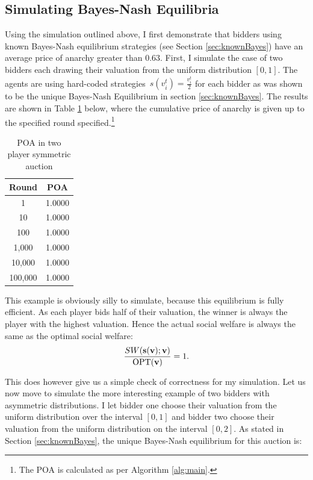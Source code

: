 \documentclass[12pt,twoside]{reedthesis}
\begin{document}
\subsection{Simulating Bayes-Nash Equilibria}
Using the simulation outlined above, I first demonstrate that bidders using known Bayes-Nash equilibrium strategies (see Section \ref{sec:knownBayes}) have an average price of anarchy greater than $0.63$. First, I simulate the case of two bidders each drawing their valuation from the uniform distribution $[0,1]$. The agents are using hard-coded strategies~$s(v^t_i) = \frac{v^t_i}{2}$ for each bidder as was shown to be the unique Bayes-Nash Equilibrium in section \ref{sec:knownBayes}. The results are shown in Table \ref{table:1} below, where the cumulative price of anarchy is given up to the specified round specified.\footnote{The POA is calculated as per Algorithm \ref{alg:main}. %
}

\begin{table}[h!]
\begin{center}
\begin{tabular}{ |c|c| }
	\hline
	Round & POA \\
	\hline
	1 & 1.0000 \\
	10 & 1.0000 \\
	100 & 1.0000 \\
	1,000 & 1.0000 \\
	10,000 & 1.0000 \\
	100,000 & 1.0000 \\
	\hline
\end{tabular}
\caption{POA in two player symmetric auction}
\label{table:1}
\end{center} 
\end{table}

This example is obviously silly to simulate, because this equilibrium is fully efficient. As each player bids half of their valuation, the winner is always the player with the highest valuation. Hence the actual social welfare is always the same as the optimal social welfare: $$\frac{SW(\textbf{s}(\textbf{v}); \textbf{v})}{\text{OPT}(\textbf{v})} = 1.$$

This does however give us a simple check of correctness for my simulation. Let us now move to simulate the more interesting example of two bidders with asymmetric distributions. I let bidder one choose their valuation from the uniform distribution over the interval $[0,1]$ and bidder two choose their valuation from the uniform distribution on the interval $[0,2]$. As stated in Section \ref{sec:knownBayes}, the unique Bayes-Nash equilibrium for this auction is:
\end{document}
